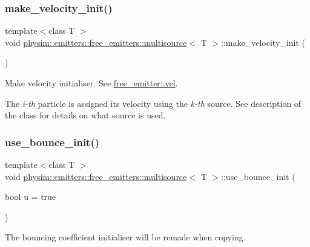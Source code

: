 \subsubsection{\texorpdfstring{make\+\_\+velocity\+\_\+init()}{make\_velocity\_init()}}
{\footnotesize\ttfamily template$<$class T $>$ \\
void \hyperlink{classphysim_1_1emitters_1_1free__emitters_1_1multisource}{physim\+::emitters\+::free\+\_\+emitters\+::multisource}$<$ T $>$\+::make\+\_\+velocity\+\_\+init (\begin{DoxyParamCaption}{ }\end{DoxyParamCaption})}



Make velocity initialiser. See \hyperlink{classphysim_1_1emitters_1_1base__emitter_a9ea19d96450cff65882371b61a2294c8}{free\+\_\+emitter\+::vel}. 

The {\itshape i-\/th} particle is assigned its velocity using the {\itshape k-\/th} source. See description of the class for details on what source is used. \mbox{\label{classphysim_1_1emitters_1_1free__emitters_1_1multisource_a7953b29add1e27f1b6937ca3191d6f2f}} 
\subsubsection{\texorpdfstring{use\+\_\+bounce\+\_\+init()}{use\_bounce\_init()}}
{\footnotesize\ttfamily template$<$class T $>$ \\
void \hyperlink{classphysim_1_1emitters_1_1free__emitters_1_1multisource}{physim\+::emitters\+::free\+\_\+emitters\+::multisource}$<$ T $>$\+::use\+\_\+bounce\+\_\+init (\begin{DoxyParamCaption}\item[{bool}]{u = {\ttfamily true} }\end{DoxyParamCaption})}



The bouncing coefficient initialiser will be remade when copying. 


